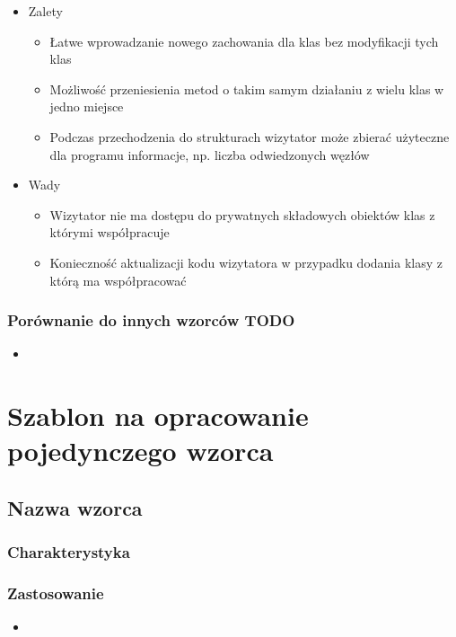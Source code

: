 \documentclass[a4paper,15pt]{article}
\begin{document}
\begin{itemize}
\item Zalety
\begin{itemize}
\item Łatwe wprowadzanie nowego zachowania dla klas bez modyfikacji tych klas
\item Możliwość przeniesienia metod o takim samym działaniu z wielu klas w jedno miejsce
\item Podczas przechodzenia do strukturach wizytator może zbierać użyteczne dla programu informacje, np. liczba odwiedzonych węzłów
\end{itemize}
\item Wady
\begin{itemize}
\item Wizytator nie ma dostępu do prywatnych składowych obiektów klas z którymi współpracuje
\item Konieczność aktualizacji kodu wizytatora w przypadku dodania klasy z którą ma współpracować
\end{itemize}
\end{itemize}


\subsubsection{Porównanie do innych wzorców TODO}
\begin{itemize}
\item 
\end{itemize}


\newpage
\section{Szablon na opracowanie pojedynczego wzorca}


\subsection{Nazwa wzorca}

\subsubsection{Charakterystyka}


\subsubsection{Zastosowanie}
\begin{itemize}
\item 
\end{itemize}
\end{document}
